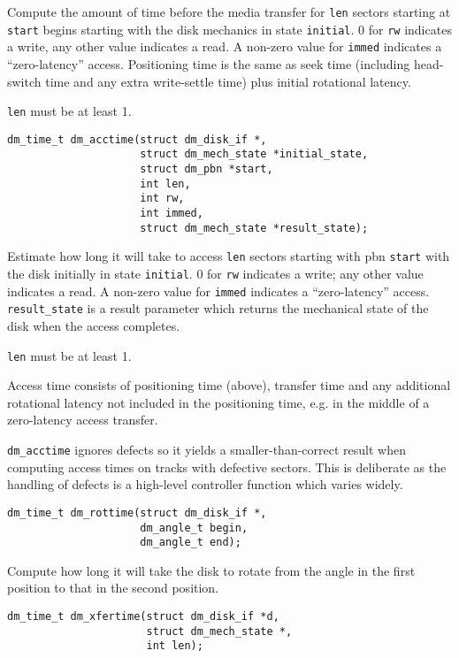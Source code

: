 Compute the amount of time before the media transfer for \texttt{len}
sectors starting at \texttt{start} begins starting with the disk
mechanics in state \texttt{initial}.  0 for \texttt{rw} indicates a
write, any other value indicates a read.  A non-zero value for
\texttt{immed} indicates a ``zero-latency'' access.  Positioning time
is the same as seek time (including head-switch time and any extra
write-settle time) plus initial rotational latency.

\texttt{len} must be at least 1.

\begin{verbatim}
dm_time_t dm_acctime(struct dm_disk_if *, 
                     struct dm_mech_state *initial_state,
                     struct dm_pbn *start,
                     int len,
                     int rw,
                     int immed,
                     struct dm_mech_state *result_state);
\end{verbatim}

Estimate how long it will take to access \texttt{len} sectors starting
with pbn \texttt{start} with the disk initially in state
\texttt{initial}. 0 for \texttt{rw} indicates a write; any other value
indicates a read.  A non-zero value for \texttt{immed} indicates a
``zero-latency'' access.  \texttt{result\_state} is a result parameter
which returns the mechanical state of the disk when the access
completes.

\texttt{len} must be at least 1.

Access time consists of positioning time (above), transfer time and
any additional rotational latency not included in the positioning
time, e.g. in the middle of a zero-latency access transfer. 

\texttt{dm\_acctime} ignores defects so it yields a smaller-than-correct 
result when computing access times on tracks with defective sectors.
This is deliberate as the handling of defects is a high-level
controller function which varies widely.

\begin{verbatim}
dm_time_t dm_rottime(struct dm_disk_if *,
                     dm_angle_t begin,
                     dm_angle_t end);
\end{verbatim}

Compute how long it will take the disk to rotate from the angle in the
first position to that in the second position.
  

\begin{verbatim}
dm_time_t dm_xfertime(struct dm_disk_if *d,
                      struct dm_mech_state *,
                      int len);
\end{verbatim}

